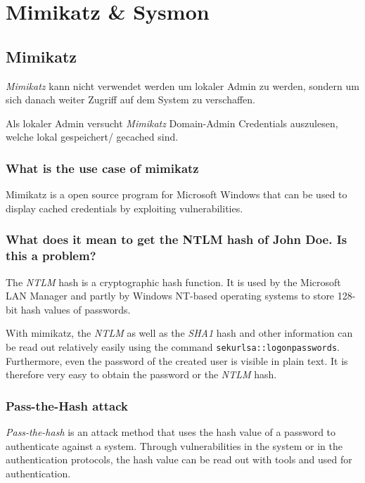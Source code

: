

\section{Mimikatz \& Sysmon}

\subsection{Mimikatz}
\textit{Mimikatz} kann nicht verwendet werden um lokaler Admin zu werden, sondern um sich danach weiter Zugriff auf dem System zu verschaffen.

Als lokaler Admin versucht \textit{Mimikatz} Domain-Admin Credentials auszulesen, welche lokal gespeichert/ gecached sind.

\subsubsection{What is the use case of mimikatz}
Mimikatz is a open source program for Microsoft Windows that can be used to display cached credentials by exploiting vulnerabilities.

\subsubsection{What does it mean to get the NTLM hash of John Doe. Is this a problem?}
The \textit{NTLM} hash is a cryptographic hash function. It is used by the Microsoft LAN Manager and partly by Windows NT-based operating systems to store 128-bit hash values of passwords.

With mimikatz, the \textit{NTLM} as well as the \textit{SHA1} hash and other information can be read out relatively easily using the command \lstinline|sekurlsa::logonpasswords|. Furthermore, even the password of the created user is visible in plain text.
It is therefore very easy to obtain the password or the \textit{NTLM} hash.

\subsubsection{Pass-the-Hash attack}
\textit{Pass-the-hash} is an attack method that uses the hash value of a password to authenticate against a system. Through vulnerabilities in the system or in the authentication protocols, the hash value can be read out with tools and used for authentication.

